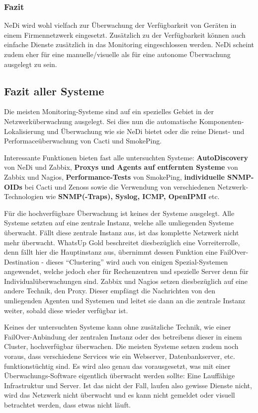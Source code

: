 \subsubsection{Fazit} \label{sec:systeme-nedi-fazit}
  NeDi wird wohl vielfach zur \"Uberwachung der Verf\"ugbarkeit von Ger\"aten in einem Firmennetzwerk eingesetzt. Zus\"atzlich zu der Verf\"ugbarkeit k\"onnen auch einfache Dienste zus\"atzlich in das Monitoring eingeschlossen werden. NeDi scheint zudem eher f\"ur eine manuelle/visuelle als f\"ur eine autonome \"Uberwachung ausgelegt zu sein.


\subsection{Fazit aller Systeme} \label{sec:systeme-fazit}
  Die meisten Monitoring-Systeme sind auf ein spezielles Gebiet in der Netzwerk\"uberwachung ausgelegt. Sei dies nun die automatische Komponenten-Lokalisierung und \"Uberwachung wie sie NeDi bietet oder die reine Dienst- und Performace\"uberwachung von Cacti und SmokePing.

  Interessante Funktionen bieten fast alle untersuchten Systeme: \textbf{AutoDiscovery} von NeDi und Zabbix, \textbf{Proxys und Agents auf entfernten Systeme} von Zabbix und Nagios, \textbf{Performance-Tests} von SmokePing, \textbf{individuelle SNMP-OIDs} bei Cacti und Zenoss sowie die Verwendung von verschiedenen Netzwerk-Technologien wie \textbf{SNMP(-Traps), Syslog, ICMP, OpenIPMI} etc.

  F\"ur die hochverf\"ugbare \"Uberwachung ist keines der Systeme ausgelegt. Alle Systeme setzten auf eine zentrale Instanz, welche alle umliegenden Systeme \"uberwacht. F\"allt diese zentrale Instanz aus, ist das komplette Netzwerk nicht mehr \"uberwacht. WhatsUp Gold beschreitet diesbez\"uglich eine Vorreiterrolle, denn f\"allt hier die Hauptinstanz aus, \"ubernimmt dessen Funktion eine FailOver-Destination - dieses "`Clustering"' wird auch von einigen Spezial-Systemen angewendet, welche jedoch eher f\"ur Rechenzentren und spezielle Server denn f\"ur Individual\"uberwachungen sind. Zabbix und Nagios setzen diesbez\"uglich auf eine andere Technik, den Proxy. Dieser empf\"angt die Nachrichten von den umliegenden Agenten und Systemen und leitet sie dann an die zentrale Instanz weiter, sobald diese wieder verf\"ugbar ist.

  Keines der untersuchten Systeme kann ohne zus\"atzliche Technik, wie einer FailOver-Anbindung der zentralen Instanz oder des betreibens dieser in einem Cluster, hochverf\"ugbar \"uberwachen. Die meisten Systeme setzen zudem noch voraus, dass verschiedene Services wie ein Webserver, Datenbankserver, etc. funktionst\"uchtig sind. Es wird also genau das vorausgesetzt, was mit einer \"Uberwachungs-Software eigentlich \"uberwacht werden sollte: Eine Lauff\"ahige Infrastruktur und Server. Ist das nicht der Fall, laufen also gewisse Dienste nicht, wird das Netzwerk nicht \"uberwacht und es kann nicht gemeldet oder visuell betrachtet werden, dass etwas nicht l\"auft.

